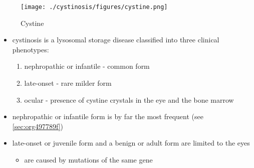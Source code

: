 \documentclass{scrartcl}
\begin{document}
\begin{figure}[htbp]
\centering
\texttt{[image: ./cystinosis/figures/cystine.png]}
\caption{\label{fig:org3c955ca}
Cystine}
\end{figure}

\begin{itemize}
\item cystinosis is a lysosomal storage disease classified into three
clinical phenotypes:
\begin{enumerate}
\item nephropathic or infantile - common form
\item late-onset - rare milder form
\item ocular - presence of cystine crystals in the eye and the bone
marrow
\end{enumerate}
\item nephropathic or infantile form is by far the most frequent (see \ref{sec:org497789f})
\item late-onset or juvenile form and a benign or adult form are limited to the eyes
\begin{itemize}
\item are caused by mutations of the same gene
\end{itemize}
\end{itemize}
\end{document}
